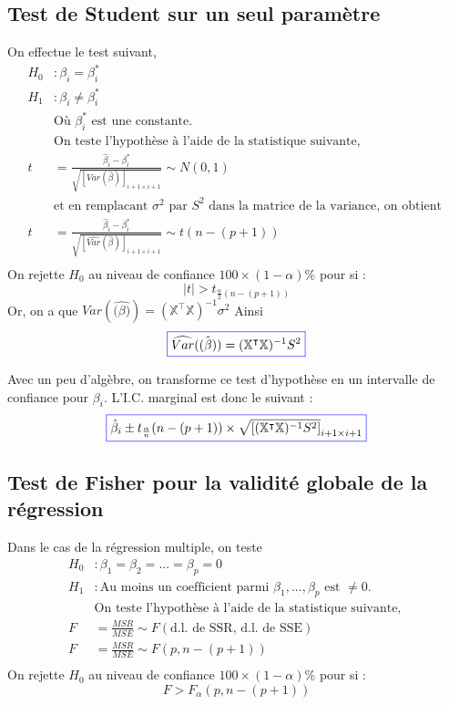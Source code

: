 \documentclass[11pt,french]{report}
\begin{document}
\subsection{Test de Student sur un seul paramètre}
On effectue le test suivant, 
\begin{align*}
H_0 &: \beta_i = \beta_i^* \\
H_1 &: \beta_i \neq \beta_i^* \\
&\text{Où $\beta_i^*$ est une constante.} \\
&\text{On teste l'hypothèse à l'aide de la statistique suivante, } \\
t &= \frac{\hat{\beta}_i - \beta_i^* }{\sqrt{[{Var}(\hat{\beta})]_{i+1 \times i+1}}} \sim N(0, 1) \\
&\text{et en remplacant $\sigma^2$ par $S^2$ dans la matrice de la variance, on obtient }\\
t &= \frac{\hat{\beta}_i - \beta_i^* }{\sqrt{[\widehat{Var}(\hat{\beta})]_{i+1 \times i+1}}} \sim t(n-(p+1)) \\
\end{align*}
On rejette $H_0$ au niveau de confiance $100 \times (1 - \alpha)\%$ pour si :
$$
|t| > t_{\frac{\alpha}{2}(n-(p+1))}
$$
Or, on a que $Var(\hat{\mathbb(\beta)}) = (\mathbb{X}^\intercal\mathbb{X})^{-1}\sigma^2$ \newline
Ainsi
\begin{equation}
\label{eq:varmulti}
\color{blue}
\boxed{\color{black}
\widehat{Var}(\hat{\mathbb(\beta)}) = (\mathbb{X}^\intercal\mathbb{X})^{-1}S^2}
\end{equation}

Avec un peu d'algèbre, on transforme ce test d'hypothèse en un intervalle de confiance pour $\beta_i$. L'I.C. marginal est donc le suivant :
\begin{equation}
\label{eq:ICmulti}
\color{blue}
\boxed{\color{black}
\hat{\beta}_i \pm t_{\frac{\alpha}{n}}(n - (p+1)) \times \sqrt{[(\mathbb{X}^\intercal\mathbb{X})^{-1}S^2]}_{i+1 \times i+1} }
\end{equation}

\subsection{Test de Fisher pour la validité globale de la régression}
\label{sec:fisherT}
Dans le cas de la régression multiple, on teste 
\begin{align*}
H_0 &: \beta_1 = \beta_2 = ... = \beta_p = 0 \\
H_1 &: \text{Au moins un coefficient parmi $\beta_1,...,\beta_p$ est $\neq 0$.} \\
&\text{On teste l'hypothèse à l'aide de la statistique suivante, } \\
F &= \frac{MSR}{MSE} \sim F(\text{d.l. de SSR, d.l. de SSE}) \\
F &= \frac{MSR}{MSE} \sim F(p, n - (p+1)) \\
\end{align*}
On rejette $H_0$ au niveau de confiance $100 \times (1 - \alpha)\%$ pour si :
$$
F > F_{\alpha}(p, n-(p+1))
$$
\end{document}
